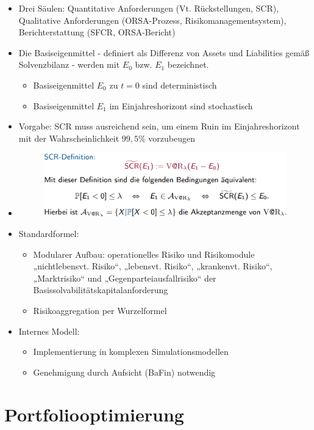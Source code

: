 \documentclass[12pt]{report}
\theoremstyle{dotless}
\theoremstyle{definition}
\begin{document}
\begin{itemize}
\item Drei Säulen: Quantitative Anforderungen (Vt. Rückstellungen, SCR), Qualitative Anforderungen (ORSA-Prozess, Risikomanagementsystem), Berichterstattung (SFCR, ORSA-Bericht)
\item Die Basiseigenmittel - definiert als Differenz von Assets und Liabilities gemäß
Solvenzbilanz - werden mit $E_0$ bzw. $E_1$ bezeichnet.
\begin{itemize}
\item Basiseigenmittel $E_0$ zu $t = 0$ sind deterministisch
\item Basiseigenmittel $E_1$ im Einjahreshorizont sind stochastisch
\end{itemize}
\item Vorgabe: SCR muss ausreichend sein, um einem Ruin im Einjahreshorizont mit der
Wahrscheinlichkeit $99,5 \%$ vorzubeugen
\item \begin{figure}[ht]
	\centering
	\includegraphics[width=0.9 \textwidth]{Bilder/SCR.png}
\end{figure}
\item Standardformel:
\begin{itemize}
\item Modularer Aufbau: operationelles Risiko und
Risikomodule „nichtlebensvt. Risiko“, „lebensvt.
Risiko“, „krankenvt. Risiko“, „Marktrisiko“ und
„Gegenparteiausfallrisiko“ der
Basissolvabilitätskapitalanforderung 
\item Risikoaggregation per Wurzelformel
\end{itemize}
\item Internes Modell:
\begin{itemize}
\item Implementierung in komplexen Simulationsmodellen
\item Genehmigung durch Aufsicht (BaFin) notwendig
\end{itemize}
\end{itemize}





\chapter{Portfoliooptimierung}
\end{document}
